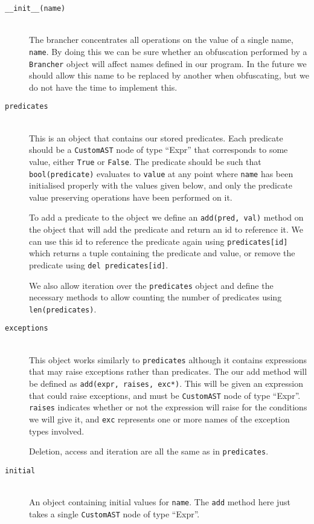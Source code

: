 \documentclass[twoside,a4paper]{report}
\begin{document}
\begin{description}
\item[\texttt{\_\_init\_\_(name)}] \hfill \\
The brancher concentrates all operations on the value of a single name, \texttt{name}. By doing this we can be sure whether an obfuscation performed by a
\texttt{Brancher} object will affect names defined in our program. In the future we should allow this name to be replaced by another when obfuscating, but
we do not have the time to implement this.

\item[\texttt{predicates}] \hfill \\
This is an object that contains our stored predicates. Each predicate should be a \texttt{CustomAST} node of type ``Expr'' that corresponds to some value, either
\texttt{True} or \texttt{False}. The predicate should be such that \texttt{bool(predicate)} evaluates to \texttt{value} at any point where \texttt{name} has
been initialised properly with the values given below, and only the predicate value preserving operations have been performed on it.

To add a predicate to the object we define an \texttt{add(pred, val)} method on the object that will add the predicate and return an id to reference it. We
can use this id to reference the predicate again using \texttt{predicates[id]} which returns a tuple containing the predicate and value, or remove the
predicate using \texttt{del predicates[id]}.

We also allow iteration over the \texttt{predicates} object and define the necessary methods to allow counting the number of predicates using
\texttt{len(predicates)}.

\item[\texttt{exceptions}] \hfill \\
This object works similarly to \texttt{predicates} although it contains expressions that may raise exceptions rather than predicates. The our add method
will be defined as \texttt{add(expr, raises, exc*)}. This will be given an expression that could raise exceptions, and must be \texttt{CustomAST} node of
type ``Expr''. \texttt{raises} indicates whether or not the expression will raise for the conditions we will give it, and \texttt{exc} represents one or more
names of the exception types involved.

Deletion, access and iteration are all the same as in \texttt{predicates}.

\item[\texttt{initial}] \hfill \\
An object containing initial values for \texttt{name}. The \texttt{add} method here just takes a single \texttt{CustomAST} node of type ``Expr''.


\end{description}
\end{document}
